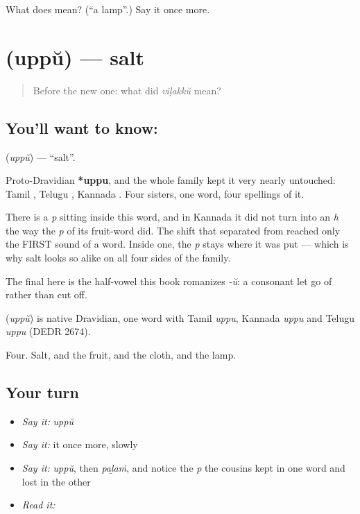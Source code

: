 \begin{tcolorbox}[breakable,colback=teal!4,colframe=teal!35!black,title={Before you move on}]
What does  mean? (\textquotedblleft{}a lamp\textquotedblright{}.) Say it once more.
\end{tcolorbox}
\section[\texorpdfstring{\ml{ഉപ്പ്} (uppŭ)}{ഉപ്പ് (uppŭ)}]{ (uppŭ) — salt}

\label{lesson:ML-C46-salt}



\begin{quote}
Before the new one: what did \emph{viḷakkŭ} mean?
\end{quote}

\subsection*{You'll want to know: }
\textbf{} (\emph{uppŭ}) — \textquotedblleft{}salt\textquotedblright{}.

Proto-Dravidian \textbf{*uppu}, and the whole family kept it very nearly untouched: Tamil , Telugu , Kannada . Four sisters, one word, four spellings of it.

There is a \emph{p} sitting inside this word, and in Kannada it did not turn into an \emph{h} the way the \emph{p} of its fruit-word did. The shift that separated  from  reached only the FIRST sound of a word. Inside one, the \emph{p} stays where it was put — which is why salt looks so alike on all four sides of the family.

The final  here is the half-vowel this book romanizes \emph{-ŭ}: a consonant let go of rather than cut off.

\begin{cousinweb}
\textbf{} (\emph{uppŭ}) is native Dravidian, one word with Tamil \emph{uppu}, Kannada \emph{uppu} and Telugu \emph{uppu} (DEDR 2674).
\end{cousinweb}

\begin{grammarlens}[title={What you've built}]
Four. Salt, and the fruit, and the cloth, and the lamp.
\end{grammarlens}

\subsection*{Your turn}
\begin{itemize}
\raggedright
  \item \emph{Say it:} \emph{uppŭ}
  \item \emph{Say it:} it once more, slowly
  \item \emph{Say it:} \emph{uppŭ}, then \emph{paḻaṁ}, and notice the \emph{p} the cousins kept in one word and lost in the other
  \item \emph{Read it:} \textbf{}
\end{itemize}

